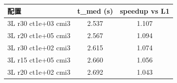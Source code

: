 \begin{tabular}{l c c}
\hline
配置 & t\_med (s) & speedup vs L1 \\
\hline
 3L r30 ct1e+03 cmi3 & 2.537 & 1.107 \\
 3L r20 ct1e+05 cmi3 & 2.567 & 1.094 \\
 3L r30 ct1e+02 cmi3 & 2.615 & 1.074 \\
 3L r15 ct1e+05 cmi3 & 2.660 & 1.056 \\
 3L r20 ct1e+02 cmi3 & 2.692 & 1.043 \\
\hline
\end{tabular}
